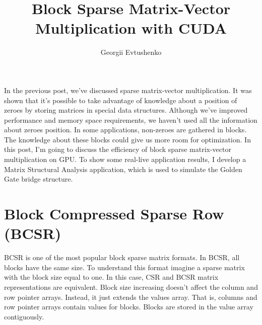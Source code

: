 \documentclass{article}
\begin{document}
\title{Block Sparse Matrix-Vector Multiplication with CUDA}
\author{Georgii Evtushenko}

\maketitle

In the previous post, we've discussed sparse matrix-vector multiplication. It was shown that it's possible to take advantage 
of knowledge about a position of zeroes by storing matrices in special data structures. Although we've improved performance 
and memory space requirements, we haven't used all the information about zeroes position. In some applications, non-zeroes 
are gathered in blocks. The knowledge about these blocks could give us more room for optimization. In this post, I'm going 
to discuss the efficiency of block sparse matrix-vector multiplication on GPU. To show some real-live application results, 
I develop a Matrix Structural Analysis application, which is used to simulate the Golden Gate bridge structure. 

\section{Block Compressed Sparse Row (BCSR)}
BCSR is one of the most popular block sparse matrix formats. In BCSR, all blocks have the same size. To understand this 
format imagine a sparse matrix with the block size equal to one. In this case, CSR and BCSR matrix representations are 
equivalent. Block size increasing doesn't affect the column and row pointer arrays. Instead, it just extends the values 
array. That is, columns and row pointer arrays contain values for blocks. Blocks are stored in the value array contiguously. 
\end{document}
